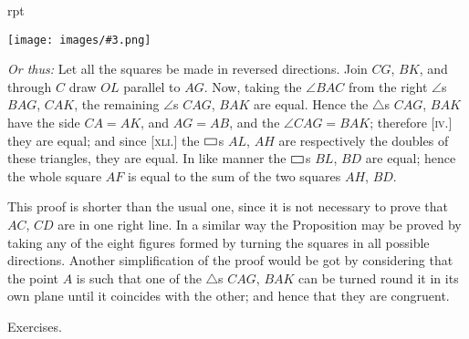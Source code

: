 \documentclass[oneside]{book}
\newcounter{wrapwidth}
\newcommand\pgram{
	\setlength{\unitlength}{1pt}
	\begin{picture}(11,8)(0,0)
	\linethickness{0.5pt}
	\put(1,0){\line(1,0){9}}
	\put(1,0){\line(0,1){5}}
	\put(1,5){\line(1,0){9}}
	\put(10,0){\line(0,1){5}}
	\end{picture}}
\newcommand\exhead[1]{
\Needspace*{5\baselineskip}\begin{center}
\textsf{#1}
\end{center}
}
\newcommand\imgflow[3]{
\setcounter{wrapwidth}{#1}
\begin{wrapfigure}[#2]{r}{\value{wrapwidth}pt}
\begin{center}
\vspace{-0.3in}
\texttt{[image: images/\#3.png]}
\end{center}
\end{wrapfigure}
}
\begin{document}
\imgflow{115}{15}{f069}

\begin{footnotesize}

\emph{Or thus:} Let all the squares be made in reversed directions.
Join $CG$, $BK$, and through $C$ draw $OL$
parallel to $AG$. Now, taking the $\angle BAC$
from the right $\angle$s $BAG$, $CAK$, the remaining
$\angle$s $CAG$, $BAK$ are equal.
Hence the $\triangle$s $CAG$, $BAK$ have the side
$CA = AK$, and $AG = AB$, and the
$\angle CAG= BAK$; therefore [\textsc{iv}.] they are
equal; and since [\textsc{xli}.] the $\pgram$s $AL$, $AH$
are respectively the doubles of these
triangles, they are equal. In like manner
the $\pgram$s  $BL$, $BD$ are equal; hence
the whole square $AF$ is equal to the
sum of the two squares $AH$, $BD$.

This proof is shorter than the usual
one, since it is not necessary to prove
that $AC$, $CD$ are in one right line. In a similar way the
Proposition may be proved by taking any of the eight figures
formed by turning the squares in all possible directions. Another
simplification of the proof would be got by considering that the
point $A$ is such that one of the $\triangle$s $CAG$, $BAK$ can be turned
round it in its own plane until it coincides with the other; and
hence that they are congruent.
\par\end{footnotesize}



\exhead{Exercises.}
\end{document}
